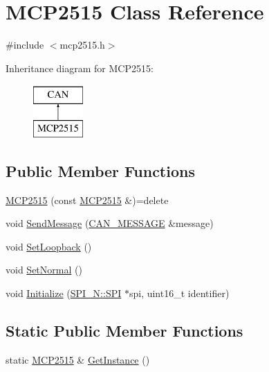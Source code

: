 \hypertarget{class_m_c_p2515}{\section{M\-C\-P2515 Class Reference}
\label{class_m_c_p2515}
}


{\ttfamily \#include $<$mcp2515.\-h$>$}

Inheritance diagram for M\-C\-P2515\-:\begin{figure}[H]
\begin{center}
\leavevmode
\includegraphics[height=2.000000cm]{class_m_c_p2515}
\end{center}
\end{figure}
\subsection*{Public Member Functions}
\begin{DoxyCompactItemize}
\item 
\hyperlink{class_m_c_p2515_a8cd4111604b740feb758bd4d077f4fb8}{M\-C\-P2515} (const \hyperlink{class_m_c_p2515}{M\-C\-P2515} \&)=delete
\item 
void \hyperlink{class_m_c_p2515_aa8c9fe944f7e6e99feb3f56a1c099a29}{Send\-Message} (\hyperlink{struct_c_a_n___m_e_s_s_a_g_e}{C\-A\-N\-\_\-\-M\-E\-S\-S\-A\-G\-E} \&message)
\item 
void \hyperlink{class_m_c_p2515_a7aac5fdb713b83933391348f1188f2b9}{Set\-Loopback} ()
\item 
void \hyperlink{class_m_c_p2515_a58601a9d30863ebac441d641ddfac44e}{Set\-Normal} ()
\item 
void \hyperlink{class_m_c_p2515_a60a93ccc1a0b21caaba5fda5f88117d2}{Initialize} (\hyperlink{class_s_p_i___n_1_1_s_p_i}{S\-P\-I\-\_\-\-N\-::\-S\-P\-I} $\ast$spi, uint16\-\_\-t identifier)
\end{DoxyCompactItemize}
\subsection*{Static Public Member Functions}
\begin{DoxyCompactItemize}
\item 
static \hyperlink{class_m_c_p2515}{M\-C\-P2515} \& \hyperlink{class_m_c_p2515_a3f53839a9258086fd21e2fc4190de60d}{Get\-Instance} ()
\end{DoxyCompactItemize}
